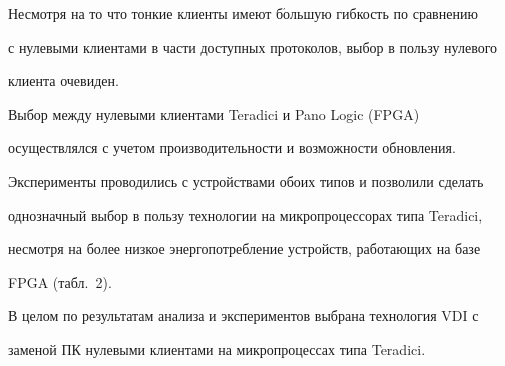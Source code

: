   Несмотря на то что тонкие клиенты имеют б$\acute{\mbox{о}}$льшую гибкость по сравнению 

с нулевыми клиентами в части доступных протоколов, выбор в пользу нулевого 

клиента очевиден. 

  

  Выбор между нулевыми клиентами Teradici и Pano Logic (FPGA) 

осуществлялся с учетом производительности и возможности обновления. 

Эксперименты проводились с устройствами обоих типов и позволили сделать 

однозначный выбор в пользу технологии на микропроцессорах типа Teradici, 

несмотря на более низкое энергопотребление устройств, работающих на базе 

FPGA (табл.~2). 

  

     

  В целом по результатам анализа и экспериментов выбрана технология VDI с 

заменой ПК нулевыми клиентами на микропроцессах типа Teradici. 



